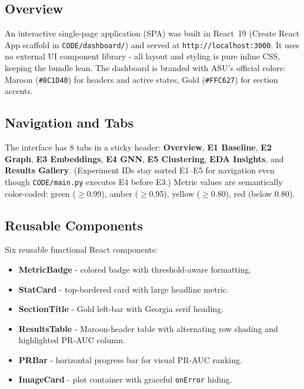 \documentclass[conference]{IEEEtran}
\begin{document}
\subsection{Overview}

An interactive single-page application (SPA) was built in React~19 (Create React App scaffold in \texttt{CODE/dashboard/}) and served at \texttt{http://localhost:3000}. It uses no external UI component library - all layout and styling is pure inline CSS, keeping the bundle lean. The dashboard is branded with ASU's official colors: Maroon (\texttt{\#8C1D40}) for headers and active states, Gold (\texttt{\#FFC627}) for section accents.

\subsection{Navigation and Tabs}

The interface has 8 tabs in a sticky header: \textbf{Overview}, \textbf{E1 Baseline}, \textbf{E2 Graph}, \textbf{E3 Embeddings}, \textbf{E4 GNN}, \textbf{E5 Clustering}, \textbf{EDA Insights}, and \textbf{Results Gallery}. (Experiment IDs stay sorted E1--E5 for navigation even though \texttt{CODE/main.py} executes E4 before E3.) Metric values are semantically color-coded: green ($\geq$0.99), amber ($\geq$0.95), yellow ($\geq$0.80), red (below 0.80).

\subsection{Reusable Components}

Six reusable functional React components:
\begin{itemize}
    \item \textbf{MetricBadge} - colored badge with threshold-aware formatting.
    \item \textbf{StatCard} - top-bordered card with large headline metric.
    \item \textbf{SectionTitle} - Gold left-bar with Georgia serif heading.
    \item \textbf{ResultsTable} - Maroon-header table with alternating row shading and highlighted PR-AUC column.
    \item \textbf{PRBar} - horizontal progress bar for visual PR-AUC ranking.
    \item \textbf{ImageCard} - plot container with graceful \texttt{onError} hiding.
\end{itemize}
\end{document}
